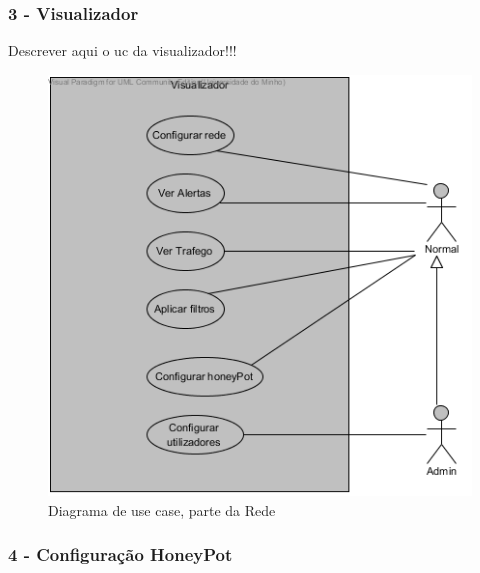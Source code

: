 \subsubsection{\textbf{3 - Visualizador}}

Descrever aqui o uc da visualizador!!!

\begin{figure}[!htb]
	\centering
	\includegraphics[scale=0.80]{images/ucs/Visualizador}
	\caption {Diagrama de use case, parte da Rede}
\end{figure}
\pagebreak






\subsubsection{\textbf{4 - Configuração HoneyPot}}

